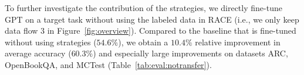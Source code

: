 \documentclass[11pt,a4paper]{article}
\newcommand{\ie}{{i.e.}}
\begin{document}
To further investigate the contribution of the strategies, we directly fine-tune GPT on a target task without using the labeled data in RACE (\ie, we only keep data flow $3$ in Figure~\ref{fig:overview}). Compared to the baseline that is fine-tuned without using strategies ($54.6\%$), we obtain a $10.4\%$ relative improvement in average accuracy ($60.3\%$) and especially large improvements on datasets ARC, OpenBookQA, and MCTest (Table~\ref{tab:eval:notransfer}).
\end{document}
